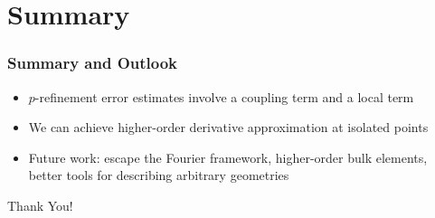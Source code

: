 \documentclass[8pt]{beamer}
\begin{document}
\section{Summary}
\begin{frame}
    \frametitle{Summary and Outlook}
    \begin{itemize}
        \item \(p\)-refinement error estimates involve a coupling term and a
              local term
        \item We can achieve higher-order derivative approximation at isolated
              points
        \item Future work: escape the Fourier framework, higher-order bulk
              elements, better tools for describing arbitrary geometries
    \end{itemize}

    \vspace{0.5in}
    \begin{center}
        \textcolor{RPIred}{\Huge Thank You!}
    \end{center}
\end{frame}
\end{document}
